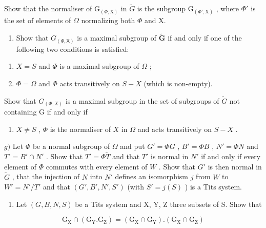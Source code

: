 Show that the normaliser of \(\mathrm{G}_{(\varPhi,\mathrm{X})}\) in \(\tilde{G}\) is the subgroup \(\mathrm{G}_{(\varPhi',\mathrm{X})}\) , where \(\varPhi'\) is the set of elements of \(\Omega\) normalizing both \(\varPhi\) and X.

\begin{enumerate}
\def\labelenumi{\alph{enumi})}
\setcounter{enumi}{5}
\tightlist
\item
  Show that \(G_{(\Phi, \mathsf{X})}\) is a maximal subgroup of \(\tilde{\mathbf{G}}\) if and only if one of the following two conditions is satisfied:
\end{enumerate}

\begin{enumerate}
\def\labelenumi{(\roman{enumi})}
\item
  \(X = S\) and \(\varPhi\) is a maximal subgroup of \(\varOmega\) ;
\item
  \(\Phi = \Omega\) and \(\Phi\) acts transitively on \(S - X\) (which is non-empty).
\end{enumerate}

Show that \(G_{(\Phi,X)}\) is a maximal subgroup in the set of subgroups of \(\tilde{G}\) not containing G if and only if

\begin{enumerate}
\def\labelenumi{(\roman{enumi})}
\setcounter{enumi}{2}
\tightlist
\item
  \(X \neq S\) , \(\Phi\) is the normaliser of \(X\) in \(\Omega\) and acts transitively on \(S - X\) .
\end{enumerate}

\(g)\) Let \(\Phi\) be a normal subgroup of \(\Omega\) and put \(G' = \Phi G\) , \(B' = \Phi B\) , \(N' = \Phi N\) and \(T' = B' \cap N'\) . Show that \(T' = \Phi \tilde{T}\) and that \(T'\) is normal in \(N'\) if and only if every element of \(\Phi\) commutes with every element of \(W\) . Show that \(G'\) is then normal in \(\tilde{G}\) , that the injection of \(N\) into \(N'\) defines an isomorphism \(j\) from \(W\) to \(W' = N'/T'\) and that \((G', B', N', S')\) (with \(S' = j(S)\) ) is a Tits system.

\begin{enumerate}
\def\labelenumi{\arabic{enumi})}
\setcounter{enumi}{8}
\tightlist
\item
  Let \((G, B, N, S)\) be a Tits system and X, Y, Z three subsets of S. Show that
\end{enumerate}

\[
\mathrm{G} _ {\mathrm{X}} \cap (\mathrm{G} _ {\mathrm{Y}}. \mathrm{G} _ {\mathrm{Z}}) = (\mathrm{G} _ {\mathrm{X}} \cap \mathrm{G} _ {\mathrm{Y}}). (\mathrm{G} _ {\mathrm{X}} \cap \mathrm{G} _ {\mathrm{Z}})
\]

